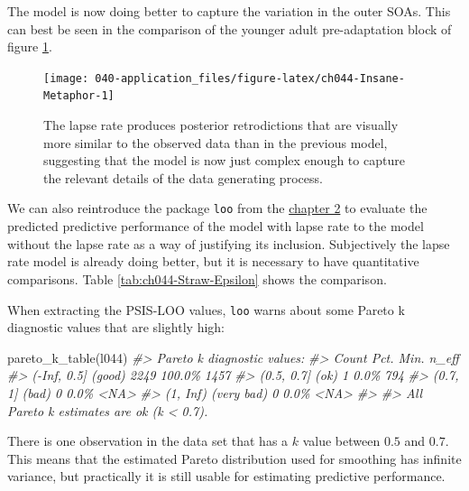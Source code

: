 \documentclass[11pt, oneside, openany]{scrbook}
\newenvironment{Shaded}{\begin{snugshade}}{\end{snugshade}}
\newcommand{\CommentTok}[1]{\textcolor[rgb]{0.56,0.35,0.01}{\textit{#1}}}
\newcommand{\FunctionTok}[1]{\textcolor[rgb]{0.00,0.00,0.00}{#1}}
\newcommand{\NormalTok}[1]{#1}
\begin{document}
The model is now doing better to capture the variation in the outer SOAs. This can best be seen in the comparison of the younger adult pre-adaptation block of figure \ref{fig:ch044-Insane-Metaphor}.

\begin{figure}

{\centering \texttt{[image: 040-application\_files/figure-latex/ch044-Insane-Metaphor-1]} 

}

\caption{The lapse rate produces posterior retrodictions that are visually more similar to the observed data than in the previous model, suggesting that the model is now just complex enough to capture the relevant details of the data generating process.}\label{fig:ch044-Insane-Metaphor}
\end{figure}

We can also reintroduce the package \texttt{loo} from the \protect\hyperlink{methods}{chapter 2} to evaluate the predicted predictive performance of the model with lapse rate to the model without the lapse rate as a way of justifying its inclusion. Subjectively the lapse rate model is already doing better, but it is necessary to have quantitative comparisons. Table \ref{tab:ch044-Straw-Epsilon} shows the comparison.

When extracting the PSIS-LOO values, \texttt{loo} warns about some Pareto k diagnostic values that are slightly high:


\begin{Shaded}
\begin{Highlighting}[]
\FunctionTok{pareto\_k\_table}\NormalTok{(l044)}
\CommentTok{\#\textgreater{} Pareto k diagnostic values:}
\CommentTok{\#\textgreater{}                          Count Pct.    Min. n\_eff}
\CommentTok{\#\textgreater{} ({-}Inf, 0.5]   (good)     2249  100.0\%  1457      }
\CommentTok{\#\textgreater{}  (0.5, 0.7]   (ok)          1    0.0\%  794       }
\CommentTok{\#\textgreater{}    (0.7, 1]   (bad)         0    0.0\%  \textless{}NA\textgreater{}      }
\CommentTok{\#\textgreater{}    (1, Inf)   (very bad)    0    0.0\%  \textless{}NA\textgreater{}      }
\CommentTok{\#\textgreater{} }
\CommentTok{\#\textgreater{} All Pareto k estimates are ok (k \textless{} 0.7).}
\end{Highlighting}
\end{Shaded}


There is one observation in the data set that has a \(k\) value between \(0.5\) and \(0.7\). This means that the estimated Pareto distribution used for smoothing has infinite variance, but practically it is still usable for estimating predictive performance.
\end{document}
